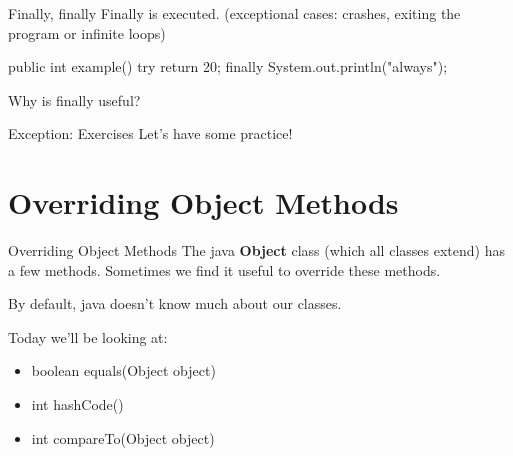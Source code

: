 \documentclass[week4]{csse2002}
\begin{document}
\begin{topic}{Finally, finally}
Finally is  executed. (exceptional cases: crashes, exiting the program or infinite loops)

\begin{java}
public int example() {
    try {
        return 20;
    } finally {
        System.out.println("always");
    }
}
\end{java}

Why is finally useful?
\end{topic}

\begin{topic}{Exception: Exercises}
	Let's have some practice!
\end{topic}

\section{Overriding Object Methods}
\begin{topic}{Overriding Object Methods}
The java \textbf{Object} class (which all classes extend) has a few
methods. Sometimes we find it useful to override these methods.

By default, java doesn't know much about our classes.

Today we'll be looking at:
\begin{itemize}
	\item boolean equals(Object object)
	\item int hashCode()
	\item int compareTo(Object object)
\end{itemize}
\end{topic}
\end{document}
